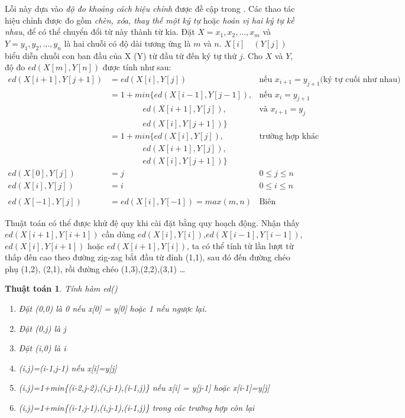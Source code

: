 \documentclass[a4paper,oneside]{book} %
\newtheorem{algo}{Thuật toán}
\begin{document}
\label{algo:ed}
Lỗi này dựa vào {\em độ đo khoảng cách hiệu chỉnh} được đề cập
trong \cite{Oflazer}. Các thao tác hiệu chỉnh được đo gồm {\em chèn,
xóa, thay thế một ký tự} hoặc {\em hoán vị hai ký tự kề nhau}, để có
thể chuyển đổi từ này thành từ kia. Đặt $X = x_1, x_2, \ldots, x_m$ và
$Y = y_1,y_2,\ldots,y_n$ là hai chuỗi có độ dài tương ứng là $m$ và
$n$. $X[i]\quad(Y[j])$ biểu diễn chuỗi con ban đầu của X (Y) từ đầu từ
đến ký tự thứ $j$. Cho $X$ và $Y$, độ đo $ed(X[m],Y[n])$ được tính như
sau:
\begin{equation}
\begin{array}{rll}
  ed(X[i+1],Y[j+1]) &= ed(X[i],Y[j]) & \text{nếu $x_{i+1}=y_{j+1}$
  (ký tự cuối như nhau)}\\
                    &= 1+min\{ed(X[i-1],Y[j-1]), & \text{nếu $x_i=y_{j+1}$}\\
                    &\qquad\qquad ed(X[i+1],Y[j]), & \text{và $x_{i+1}=y_j$}\\
                    &\qquad\qquad ed(X[i],Y[j+1])\}\\
                    &= 1+min\{ed(X[i],Y[j]),&\text{trường hợp khác}\\
                    &\qquad\qquad ed(X[i+1],Y[j]),\\
                    &\qquad\qquad ed(X[i],Y[j+1])\}\\
  ed(X[0],Y[j])     &=j & 0 \le j \le n\\
  ed(X[i],Y[j])     &=i & 0 \le i \le n\\\\
  ed(X[-1],Y[j])    &=ed(X[i],Y[-1]) = max(m,n)&\text{Biên}
\end{array}
\end{equation}

Thuật toán có thể được khử đệ quy khi cài đặt bằng quy hoạch
động. Nhận thấy $ed(X[i+1],Y[i+1])$ cần dùng
$ed(X[i],Y[i])$,$ed(X[i-1],Y[i-1])$,$ed(X[i],Y[i+1])$ hoặc
$ed(X[i+1],Y[i])$, ta có thể tính từ lần lượt từ thấp đến cao theo
đường zig-zag bắt đầu từ đỉnh (1,1), sau đó đến đường chéo phụ (1,2),
(2,1), rồi đường chéo (1,3),(2,2),(3,1) \ldots

\begin{algo} Tính hàm ed()

  \begin{enumerate}
  \item Đặt (0,0) là 0 nếu x[0] = y[0] hoặc 1 nếu ngược lại.
  \item Đặt (0,j) là j
  \item Đặt (i,0) là i
  \item (i,j)=(i-1,j-1) nếu x[i]=y[j]
  \item (i,j)=1+min\{(i-2,j-2),(i,j-1),(i-1,j)\} nếu x[i] = y[j-1]
    hoặc x[i-1]=y[j]
  \item (i,j)=1+min\{(i-1,j-1),(i,j-1),(i-1,j)\} trong các trường hợp còn lại
  \end{enumerate}
\end{algo}
\end{document}
